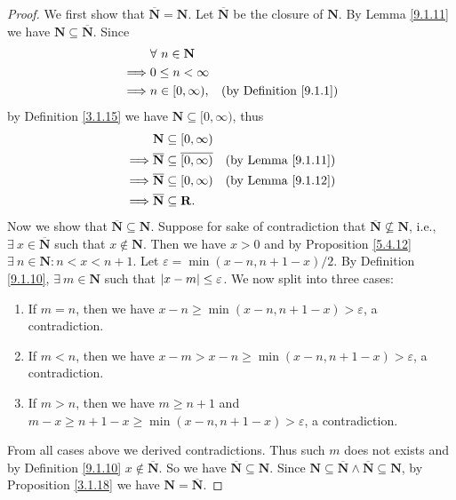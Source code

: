 \begin{proof}
    We first show that \(\overline{\mathbf{N}} = \mathbf{N}\).
    Let \(\overline{\mathbf{N}}\) be the closure of \(\mathbf{N}\).
    By Lemma \ref{9.1.11} we have \(\mathbf{N} \subseteq \overline{\mathbf{N}}\).
    Since
    \begin{align*}
                 & \forall\ n \in \mathbf{N}                                      \\
        \implies & 0 \leq n < \infty                                              \\
        \implies & n \in [0, \infty),        & \text{(by Definition \ref{9.1.1})}
    \end{align*}
    by Definition \ref{3.1.15} we have \(\mathbf{N} \subseteq [0, \infty)\), thus
    \begin{align*}
                 & \mathbf{N} \subseteq [0, \infty)                                                        \\
        \implies & \overline{\mathbf{N}} \subseteq \overline{[0, \infty)} & \text{(by Lemma \ref{9.1.11})} \\
        \implies & \overline{\mathbf{N}} \subseteq [0, \infty)            & \text{(by Lemma \ref{9.1.12})} \\
        \implies & \overline{\mathbf{N}} \subseteq \mathbf{R}.
    \end{align*}
    Now we show that \(\overline{\mathbf{N}} \subseteq \mathbf{N}\).
    Suppose for sake of contradiction that \(\overline{\mathbf{N}} \not\subseteq \mathbf{N}\), i.e., \(\exists\ x \in \overline{\mathbf{N}}\) such that \(x \notin \mathbf{N}\).
    Then we have \(x > 0\) and by Proposition \ref{5.4.12} \(\exists\ n \in \mathbf{N} : n < x < n + 1\).
    Let \(\varepsilon = \min(x - n, n + 1 - x) / 2\).
    By Definition \ref{9.1.10}, \(\exists\ m \in \mathbf{N}\) such that \(\abs*{x - m} \leq \varepsilon\).
    We now split into three cases:
    \begin{enumerate}
        \item If \(m = n\), then we have \(x - n \geq \min(x - n, n + 1 - x) > \varepsilon\), a contradiction.
        \item If \(m < n\), then we have \(x - m > x - n \geq \min(x - n, n + 1 - x) > \varepsilon\), a contradiction.
        \item If \(m > n\), then we have \(m \geq n + 1\) and \(m - x \geq n + 1 - x \geq \min(x - n, n + 1 - x) > \varepsilon\), a contradiction.
    \end{enumerate}
    From all cases above we derived contradictions.
    Thus such \(m\) does not exists and by Definition \ref{9.1.10} \(x \notin \overline{\mathbf{N}}\).
    So we have \(\overline{\mathbf{N}} \subseteq \mathbf{N}\).
    Since \(\mathbf{N} \subseteq \overline{\mathbf{N}} \land \overline{\mathbf{N}} \subseteq \mathbf{N}\), by Proposition \ref{3.1.18} we have \(\mathbf{N} = \overline{\mathbf{N}}\).


\end{proof}
